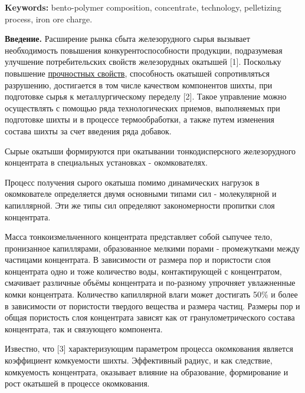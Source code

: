 {\bfseries Keywords:} bento-polymer composition, concentrate, technology,
pelletizing process, iron ore charge.
\vspace{-0.5em}
\begin{multicols}{2}
{\bfseries Введение.} Расширение рынка сбыта железорудного сырья вызывает
необходимость повышения конкурентоспособности продукции, подразумевая
улучшение потребительских свойств железорудных окатышей {[}1{]}.
Поскольку повышение
\href{https://www.yandex.ru/search/?text=\%D0\%BF\%D1\%80\%D0\%BE\%D1\%87\%D0\%BD\%D0\%BE\%D1\%81\%D1\%82\%D0\%BD\%D1\%8B\%D1\%85\%20\%D1\%81\%D0\%B2\%D0\%BE\%D0\%B9\%D1\%81\%D1\%82\%D0\%B2\%20\%20&lr=213&msid=1739867152.50217765.01245.11111&search_source=chromentp_desktop&suggest_reqid=163703149161131391771529680334996&msp=1}{прочностных свойств},
способность окатышей сопротивляться разрушению, достигается в том числе
качеством компонентов шихты, при подготовке сырья к металлургическому
переделу {[}2{]}. Такое управление можно осуществлять с помощью ряда
технологических приемов, выполняемых при подготовке шихты и в процессе
термообработки, а также путем изменения состава шихты за счет введения
ряда добавок.

Сырые окатыши формируются при окатывании тонкодисперсного железорудного
концентрата в специальных установках - окомкователях.

Процесс получения сырого окатыша помимо динамических нагрузок в
окомкователе определяется двумя основными типами сил - молекулярной и
капиллярной. Эти же типы сил определяют закономерности пропитки слоя
концентрата.

Масса тонкоизмельченного концентрата представляет собой сыпучее тело,
пронизанное капиллярами, образованное мелкими порами - промежутками
между частицами концентрата. В зависимости от размера пор и пористости
слоя концентрата одно и тоже количество воды, контактирующей с
концентратом, смачивает различные объёмы концентрата и по-разному
упрочняет увлажненные комки концентрата. Количество капиллярной влаги
может достигать 50\% и более в зависимости от пористости твердого
вещества и размера частиц. Размеры пор и общая пористость слоя
концентрата зависят как от гранулометрического состава концентрата, так
и связующего компонента.

Известно, что {[}3{]} характеризующим параметром процесса окомкования
является коэффициент комкуемости шихты. Эффективный радиус, и как
следствие, комкуемость концентрата, оказывает влияние на образование,
формирование и рост окатышей в процессе окомкования.


\end{multicols}
